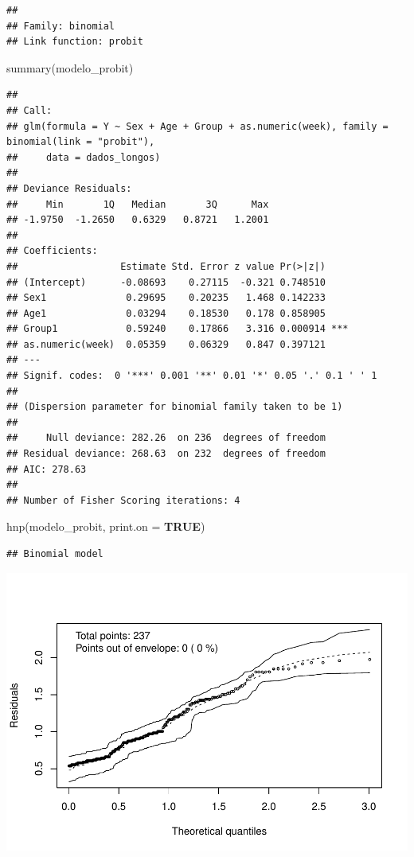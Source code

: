 \documentclass[
]{article}
\newenvironment{Shaded}{\begin{snugshade}}{\end{snugshade}}
\newcommand{\AttributeTok}[1]{\textcolor[rgb]{0.80,0.80,0.80}{#1}}
\newcommand{\ConstantTok}[1]{\textcolor[rgb]{0.86,0.64,0.64}{\textbf{#1}}}
\newcommand{\FunctionTok}[1]{\textcolor[rgb]{0.94,0.94,0.56}{#1}}
\newcommand{\NormalTok}[1]{\textcolor[rgb]{0.80,0.80,0.80}{#1}}
\begin{document}
\begin{verbatim}
## 
## Family: binomial 
## Link function: probit
\end{verbatim}

\begin{Shaded}
\begin{Highlighting}[]
\FunctionTok{summary}\NormalTok{(modelo\_probit)}
\end{Highlighting}
\end{Shaded}

\begin{verbatim}
## 
## Call:
## glm(formula = Y ~ Sex + Age + Group + as.numeric(week), family = binomial(link = "probit"), 
##     data = dados_longos)
## 
## Deviance Residuals: 
##     Min       1Q   Median       3Q      Max  
## -1.9750  -1.2650   0.6329   0.8721   1.2001  
## 
## Coefficients:
##                  Estimate Std. Error z value Pr(>|z|)    
## (Intercept)      -0.08693    0.27115  -0.321 0.748510    
## Sex1              0.29695    0.20235   1.468 0.142233    
## Age1              0.03294    0.18530   0.178 0.858905    
## Group1            0.59240    0.17866   3.316 0.000914 ***
## as.numeric(week)  0.05359    0.06329   0.847 0.397121    
## ---
## Signif. codes:  0 '***' 0.001 '**' 0.01 '*' 0.05 '.' 0.1 ' ' 1
## 
## (Dispersion parameter for binomial family taken to be 1)
## 
##     Null deviance: 282.26  on 236  degrees of freedom
## Residual deviance: 268.63  on 232  degrees of freedom
## AIC: 278.63
## 
## Number of Fisher Scoring iterations: 4
\end{verbatim}

\begin{Shaded}
\begin{Highlighting}[]
\FunctionTok{hnp}\NormalTok{(modelo\_probit, }\AttributeTok{print.on =} \ConstantTok{TRUE}\NormalTok{)}
\end{Highlighting}
\end{Shaded}

\begin{verbatim}
## Binomial model
\end{verbatim}

\includegraphics{EDA__files/figure-latex/unnamed-chunk-11-1.pdf}
\end{document}

